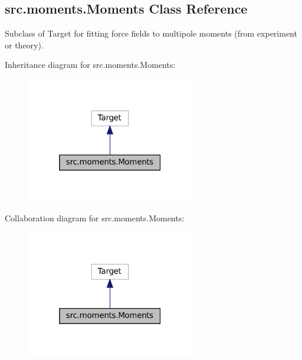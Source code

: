\hypertarget{classsrc_1_1moments_1_1Moments}{}\subsection{src.\+moments.\+Moments Class Reference}
\label{classsrc_1_1moments_1_1Moments}


Subclass of Target for fitting force fields to multipole moments (from experiment or theory).  




Inheritance diagram for src.\+moments.\+Moments\+:
\nopagebreak
\begin{figure}[H]
\begin{center}
\leavevmode
\includegraphics[width=208pt]{classsrc_1_1moments_1_1Moments__inherit__graph}
\end{center}
\end{figure}


Collaboration diagram for src.\+moments.\+Moments\+:
\nopagebreak
\begin{figure}[H]
\begin{center}
\leavevmode
\includegraphics[width=208pt]{classsrc_1_1moments_1_1Moments__coll__graph}
\end{center}
\end{figure}
